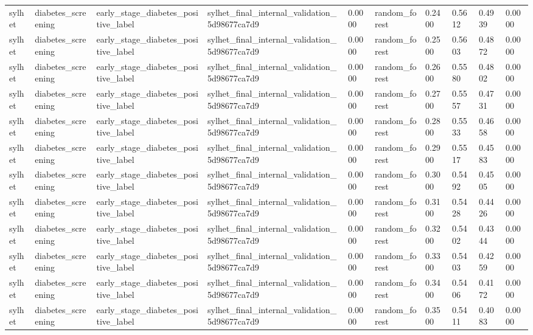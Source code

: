 \begin{tabular}{llllllllll}
sylhet & diabetes\_screening & early\_stage\_diabetes\_positive\_label & sylhet\_final\_internal\_validation\_5d98677ca7d9 & 0.0000 & random\_forest & 0.2400 & 0.5612 & 0.4939 & 0.0000 \\
sylhet & diabetes\_screening & early\_stage\_diabetes\_positive\_label & sylhet\_final\_internal\_validation\_5d98677ca7d9 & 0.0000 & random\_forest & 0.2500 & 0.5603 & 0.4872 & 0.0000 \\
sylhet & diabetes\_screening & early\_stage\_diabetes\_positive\_label & sylhet\_final\_internal\_validation\_5d98677ca7d9 & 0.0000 & random\_forest & 0.2600 & 0.5580 & 0.4802 & 0.0000 \\
sylhet & diabetes\_screening & early\_stage\_diabetes\_positive\_label & sylhet\_final\_internal\_validation\_5d98677ca7d9 & 0.0000 & random\_forest & 0.2700 & 0.5557 & 0.4731 & 0.0000 \\
sylhet & diabetes\_screening & early\_stage\_diabetes\_positive\_label & sylhet\_final\_internal\_validation\_5d98677ca7d9 & 0.0000 & random\_forest & 0.2800 & 0.5533 & 0.4658 & 0.0000 \\
sylhet & diabetes\_screening & early\_stage\_diabetes\_positive\_label & sylhet\_final\_internal\_validation\_5d98677ca7d9 & 0.0000 & random\_forest & 0.2900 & 0.5517 & 0.4583 & 0.0000 \\
sylhet & diabetes\_screening & early\_stage\_diabetes\_positive\_label & sylhet\_final\_internal\_validation\_5d98677ca7d9 & 0.0000 & random\_forest & 0.3000 & 0.5492 & 0.4505 & 0.0000 \\
sylhet & diabetes\_screening & early\_stage\_diabetes\_positive\_label & sylhet\_final\_internal\_validation\_5d98677ca7d9 & 0.0000 & random\_forest & 0.3100 & 0.5428 & 0.4426 & 0.0000 \\
sylhet & diabetes\_screening & early\_stage\_diabetes\_positive\_label & sylhet\_final\_internal\_validation\_5d98677ca7d9 & 0.0000 & random\_forest & 0.3200 & 0.5402 & 0.4344 & 0.0000 \\
sylhet & diabetes\_screening & early\_stage\_diabetes\_positive\_label & sylhet\_final\_internal\_validation\_5d98677ca7d9 & 0.0000 & random\_forest & 0.3300 & 0.5403 & 0.4259 & 0.0000 \\
sylhet & diabetes\_screening & early\_stage\_diabetes\_positive\_label & sylhet\_final\_internal\_validation\_5d98677ca7d9 & 0.0000 & random\_forest & 0.3400 & 0.5406 & 0.4172 & 0.0000 \\
sylhet & diabetes\_screening & early\_stage\_diabetes\_positive\_label & sylhet\_final\_internal\_validation\_5d98677ca7d9 & 0.0000 & random\_forest & 0.3500 & 0.5411 & 0.4083 & 0.0000 \\

\end{tabular}
